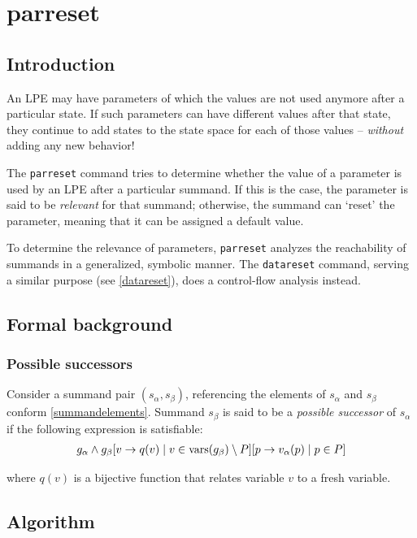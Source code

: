 \chapter{parreset}

\section{Introduction}

An LPE may have parameters of which the values are not used anymore after a particular state.
If such parameters can have different values after that state, they continue to add states to the state space for each of those values -- \emph{without} adding any new behavior!

The \texttt{parreset} command tries to determine whether the value of a parameter is used by an LPE after a particular summand.
If this is the case, the parameter is said to be \emph{relevant} for that summand; otherwise, the summand can `reset' the parameter, meaning that it can be assigned a default value.

To determine the relevance of parameters, \texttt{parreset} analyzes the reachability of summands in a generalized, symbolic manner.
The \texttt{datareset} command, serving a similar purpose (see \ref{datareset}), does a control-flow analysis instead.

\section{Formal background}

\subsection{Possible successors} \label{possiblesuccessors}

Consider a summand pair $(s_\alpha, s_\beta)$, referencing the elements of $s_\alpha$ and $s_\beta$ conform \ref{summandelements}.
Summand $s_\beta$ is said to be a \emph{possible successor} of $s_\alpha$ if the following expression is satisfiable:
\begin{align*}
g_\alpha \land {g_\beta}[v \rightarrow q(v) \;|\; v \in \text{vars}(g_\beta) \setminus P][p \rightarrow v_\alpha(p) \;|\; p \in P]
\end{align*}

where $q(v)$ is a bijective function that relates variable $v$ to a fresh variable.

\section{Algorithm}

